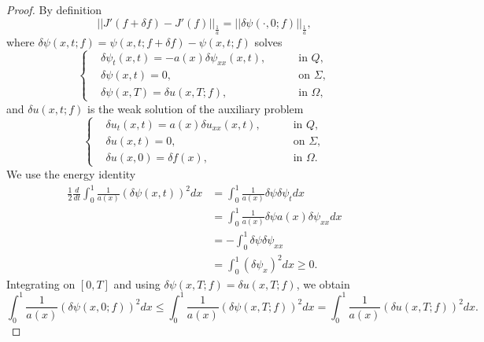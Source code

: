 \documentclass[10pt,a4paper]{amsart}
\newtheorem{empheq}{Empheq}
\begin{document}
\begin{proof}
    By definition 
    $$\vert\vert J'(f+\delta f)-J'(f)\vert\vert_{\frac{1}{a}}=\vert\vert\delta \psi(\cdot,0;f)\vert\vert_{\frac{1}{a}},$$
    where
    $\delta\psi(x,t;f)= \psi(x,t;f+\delta f)-\psi(x,t;f)$ solves
\begin{equation}
    \left\{
\begin{aligned}
& \delta\psi_{t}(x,t) = -a(x) \delta\psi_{xx}(x,t),&&\quad \text { in } Q,\\
& \delta\psi(x,t)=0, &&\quad \text { on } \Sigma,\\
& \delta\psi(x,T)=\delta u(x,T;f), &&\quad \text { in } \Omega,
\label{eq1to7}
\end{aligned}
\right.
\end{equation}
and $\delta u(x,t;f)$ is the weak solution of the auxiliary problem
\begin{equation}
    \left\{
\begin{aligned}
& \delta u_{t}(x,t) = a(x) \delta u_{xx}(x,t),&&\quad \text { in } Q,\\
& \delta u(x,t)=0, &&\quad \text { on } \Sigma,\\
& \delta u(x,0)=\delta f(x), &&\quad \text { in } \Omega.
\label{eq1to8}
\end{aligned}
\right.
\end{equation}
We use the energy identity
\begin{equation*}
    \begin{aligned}
        \frac{1}{2} \frac{d}{dt}\int_{0}^1 \frac{1}{a(x)}\left(\delta \psi(x,t)\right)^2 dx&= \int_{0}^1 \frac{1}{a(x)}\delta \psi \delta \psi_{t} dx\\& =\int_{0}^1 \frac{1}{a(x)}\delta \psi a(x) \delta \psi_{xx} dx\\&= -\int_{0}^1 \delta \psi \delta \psi_{xx}\\&= \int_{0}^1 (\delta \psi_{x})^2 dx \geqslant 0.
    \end{aligned}
\end{equation*}
Integrating on $[0,T]$ and using $\delta \psi(x,T;f)=\delta u(x,T;f)$, we obtain
$$\int_{0}^1 \frac{1}{a(x)}\left(\delta \psi(x,0;f)\right)^2 dx \leqslant \int_{0}^1 \frac{1}{a(x)}\left(\delta \psi(x,T;f)\right)^2 dx=  \int_{0}^1 \frac{1}{a(x)}\left(\delta u(x,T;f)\right)^2 dx.$$

\end{proof}
\end{document}
